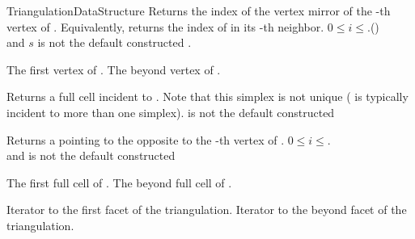 \begin{ccRefConcept}{TriangulationDataStructure}
{Returns the index of the vertex mirror of the -th vertex of .
Equivalently, returns the index of  in its -th neighbor.
\ccPrecond $0\leq i\leq$\ccVar.()\\
and $s$ is not the default constructed . }

{}
{
The first vertex of \ccVar.
}
\ccGlue
{}
{
The beyond vertex of \ccVar.
}


{Returns a full cell incident to  . Note that this simplex is
not unique ( is typically incident to more than one simplex).
\ccPrecond{} is not the default constructed }

{ Returns a  pointing to the 
opposite to the -th vertex of . 
\ccPrecond$0\leq i \leq$\ccVar.\\
and  is not the default constructed }

{}
{
The first full cell of \ccVar.
}
\ccGlue
{}
{
The beyond full cell of \ccVar.
}


{Iterator to the first facet of the triangulation.}
\ccGlue
{}
{Iterator to the beyond facet of the triangulation.}


\end{ccRefConcept}
